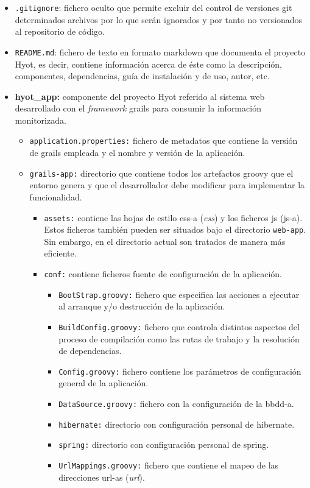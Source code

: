 \documentclass[12pt,a4paper, twoside]{report}
\begin{document}
	\begin{itemize}
		\item \texttt{.gitignore}: fichero oculto que permite excluir del control de versiones \gls{git} determinados archivos por lo que serán ignorados y por tanto no versionados al repositorio de código.
		\item \texttt{README.md}: fichero de texto en formato \gls{markdown} que documenta el proyecto Hyot, es decir, contiene información acerca de éste como la descripción, componentes, dependencias, guía de instalación y de uso, autor, etc.
		
		\item \textbf{hyot\_app:} componente del proyecto Hyot referido al sistema web desarrollado con el \textit{framework} \gls{grails} para consumir la información monitorizada.
			
		\begin{itemize}
			\item \texttt{application.properties:} fichero de metadatos que contiene la versión de \gls{grails} empleada y el nombre y versión de la aplicación.
			\item \texttt{grails-app:} directorio que contiene todos los artefactos \gls{groovy} que el entorno genera y que el desarrollador debe modificar para implementar la funcionalidad.
				 
			\begin{itemize}
				\item \texttt{assets:} contiene las hojas de estilo \gls{css-a} (\textit{\gls{css}}) y los ficheros \gls{js} (\gls{js-a}). Estos ficheros también pueden ser situados bajo el directorio \texttt{web-app}. Sin embargo, en el directorio actual son tratados de manera más eficiente. 
				\item \texttt{conf:} contiene ficheros fuente de configuración de la aplicación.
						
				\begin{itemize}
					\item \texttt{BootStrap.groovy:} fichero que especifica las acciones a ejecutar al arranque y/o destrucción de la aplicación.
					\item \texttt{BuildConfig.groovy:} fichero que controla distintos aspectos del proceso de compilación como las rutas de trabajo y la resolución de dependencias.
					\item \texttt{Config.groovy:} fichero contiene los parámetros de configuración general de la aplicación.
					\item \texttt{DataSource.groovy:} fichero con la configuración de la \gls{bbdd-a}.
					\item \texttt{hibernate:} directorio con configuración personal de \gls{hibernate}.
					\item \texttt{spring:} directorio con configuración personal de \gls{spring}.
					\item \texttt{UrlMappings.groovy:} fichero que contiene el mapeo de las direcciones \glspl{url-a} (\textit{\gls{url}}).
				\end{itemize}
						

\end{itemize}
\end{itemize}
\end{itemize}
\end{document}
